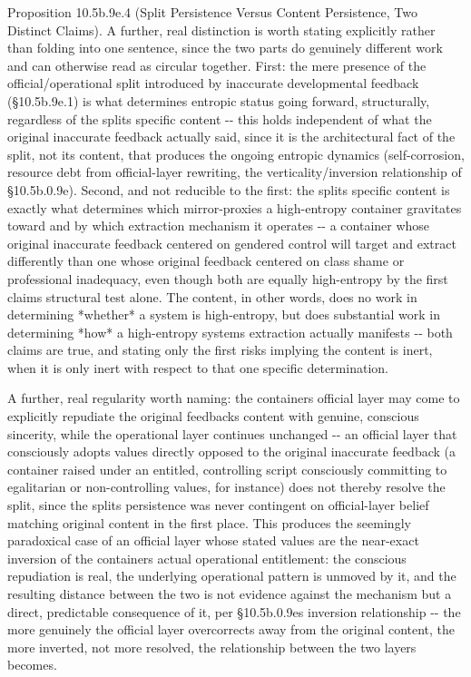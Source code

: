 \documentclass[
]{article}
\begin{document}
Proposition 10.5b.9e.4 (Split Persistence Versus Content Persistence,
Two Distinct Claims). A further, real distinction is worth stating
explicitly rather than folding into one sentence, since the two parts do
genuinely different work and can otherwise read as circular together.
First: the mere presence of the official/operational split introduced by
inaccurate developmental feedback (§10.5b.9e.1) is what determines
entropic status going forward, structurally, regardless of the splits
specific content -\/- this holds independent of what the original
inaccurate feedback actually said, since it is the architectural fact of
the split, not its content, that produces the ongoing entropic dynamics
(self-corrosion, resource debt from official-layer rewriting, the
verticality/inversion relationship of §10.5b.0.9e). Second, and not
reducible to the first: the splits specific content is exactly what
determines which mirror-proxies a high-entropy container gravitates
toward and by which extraction mechanism it operates -\/- a container
whose original inaccurate feedback centered on gendered control will
target and extract differently than one whose original feedback centered
on class shame or professional inadequacy, even though both are equally
high-entropy by the first claims structural test alone. The content, in
other words, does no work in determining *whether* a system is
high-entropy, but does substantial work in determining *how* a
high-entropy systems extraction actually manifests -\/- both claims are
true, and stating only the first risks implying the content is inert,
when it is only inert with respect to that one specific determination.

A further, real regularity worth naming: the containers official layer
may come to explicitly repudiate the original feedbacks content with
genuine, conscious sincerity, while the operational layer continues
unchanged -\/- an official layer that consciously adopts values directly
opposed to the original inaccurate feedback (a container raised under an
entitled, controlling script consciously committing to egalitarian or
non-controlling values, for instance) does not thereby resolve the
split, since the splits persistence was never contingent on
official-layer belief matching original content in the first place. This
produces the seemingly paradoxical case of an official layer whose
stated values are the near-exact inversion of the containers actual
operational entitlement: the conscious repudiation is real, the
underlying operational pattern is unmoved by it, and the resulting
distance between the two is not evidence against the mechanism but a
direct, predictable consequence of it, per §10.5b.0.9es inversion
relationship -\/- the more genuinely the official layer overcorrects
away from the original content, the more inverted, not more resolved,
the relationship between the two layers becomes.
\end{document}
